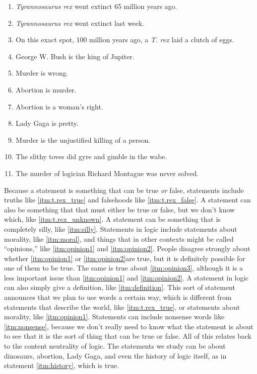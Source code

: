\begin{enumerate}[label=(\alph*)]
\item \label{itm:t.rex_true}\emph{Tyrannosaurus rex} went extinct 65 million years ago. 
\item \label{itm:t.rex_false}\emph{Tyrannosaurus rex} went extinct last week.
\item \label{itm:t.rex_unknown}On this exact spot, 100  million years ago, a \emph{T. rex} laid a clutch of eggs. 
\item \label{itm:silly}George W. Bush is the king of Jupiter. 
\item \label{itm:moral}Murder is wrong. 
\item \label{itm:opinion1}Abortion is murder. 
\item \label{itm:opinion2}Abortion is a woman's right. 
\item \label{itm:opinion3}Lady Gaga is pretty.
\item \label{itm:definition}Murder is the unjustified killing of a person.
\item \label{itm:nonsense}The slithy toves did gyre and gimble in the wabe.
\item \label{itm:history}The murder of logician Richard Montague was never solved. 
\end{enumerate}

Because a statement is something that can be true \emph{or} false, statements include truths like \ref{itm:t.rex_true} and falsehoods like \ref{itm:t.rex_false}. A statement can also be something that that must either be true or false, but we don't know which, like \ref{itm:t.rex_unknown}. A statement can be something that is completely silly, like \ref{itm:silly}. Statements in logic include statements about morality, like \ref{itm:moral}, and things that in other contexts might be called ``opinions,'' like \ref{itm:opinion1} and \ref{itm:opinion2}. People disagree strongly about whether \ref{itm:opinion1} or \ref{itm:opinion2}are true, but it is definitely possible for one of them to be true. The same is true about \ref{itm:opinion3}, although it is a less important issue than \ref{itm:opinion1} and \ref{itm:opinion2}. A statement in logic can also simply give a definition, like \ref{itm:definition}. This sort of statement announces that we plan to use words a certain way, which is different from statements that describe the world, like \ref{itm:t.rex_true}, or statements about morality, like \ref{itm:opinion1}. Statements can include nonsense words like \ref{itm:nonsense}, because we don't really need to know what the statement is about to see that it is the sort of thing that can be true or false. All of this relates back to the content neutrality of logic. The statements we study can be about dinosaurs, abortion, Lady Gaga, and even the history of logic itself, as in statement \ref{itm:history}, which is true.

